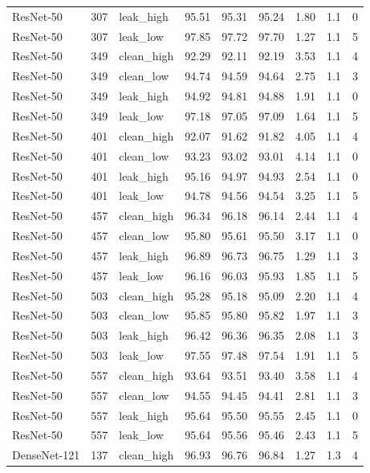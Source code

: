 {\begin{longtable}{lrlrrrrrr}
ResNet-50 & 307 & leak\_high & 95.51 & 95.31 & 95.24 & 1.80 & 1.1 & 0 \\
ResNet-50 & 307 & leak\_low & 97.85 & 97.72 & 97.70 & 1.27 & 1.1 & 5 \\
ResNet-50 & 349 & clean\_high & 92.29 & 92.11 & 92.19 & 3.53 & 1.1 & 4 \\
ResNet-50 & 349 & clean\_low & 94.74 & 94.59 & 94.64 & 2.75 & 1.1 & 3 \\
ResNet-50 & 349 & leak\_high & 94.92 & 94.81 & 94.88 & 1.91 & 1.1 & 0 \\
ResNet-50 & 349 & leak\_low & 97.18 & 97.05 & 97.09 & 1.64 & 1.1 & 5 \\
ResNet-50 & 401 & clean\_high & 92.07 & 91.62 & 91.82 & 4.05 & 1.1 & 4 \\
ResNet-50 & 401 & clean\_low & 93.23 & 93.02 & 93.01 & 4.14 & 1.1 & 0 \\
ResNet-50 & 401 & leak\_high & 95.16 & 94.97 & 94.93 & 2.54 & 1.1 & 0 \\
ResNet-50 & 401 & leak\_low & 94.78 & 94.56 & 94.54 & 3.25 & 1.1 & 5 \\
ResNet-50 & 457 & clean\_high & 96.34 & 96.18 & 96.14 & 2.44 & 1.1 & 4 \\
ResNet-50 & 457 & clean\_low & 95.80 & 95.61 & 95.50 & 3.17 & 1.1 & 0 \\
ResNet-50 & 457 & leak\_high & 96.89 & 96.73 & 96.75 & 1.29 & 1.1 & 3 \\
ResNet-50 & 457 & leak\_low & 96.16 & 96.03 & 95.93 & 1.85 & 1.1 & 5 \\
ResNet-50 & 503 & clean\_high & 95.28 & 95.18 & 95.09 & 2.20 & 1.1 & 4 \\
ResNet-50 & 503 & clean\_low & 95.85 & 95.80 & 95.82 & 1.97 & 1.1 & 3 \\
ResNet-50 & 503 & leak\_high & 96.42 & 96.36 & 96.35 & 2.08 & 1.1 & 3 \\
ResNet-50 & 503 & leak\_low & 97.55 & 97.48 & 97.54 & 1.91 & 1.1 & 5 \\
ResNet-50 & 557 & clean\_high & 93.64 & 93.51 & 93.40 & 3.58 & 1.1 & 4 \\
ResNet-50 & 557 & clean\_low & 94.55 & 94.45 & 94.41 & 2.81 & 1.1 & 3 \\
ResNet-50 & 557 & leak\_high & 95.64 & 95.50 & 95.55 & 2.45 & 1.1 & 0 \\
ResNet-50 & 557 & leak\_low & 95.64 & 95.56 & 95.46 & 2.43 & 1.1 & 5 \\
DenseNet-121 & 137 & clean\_high & 96.93 & 96.76 & 96.84 & 1.27 & 1.3 & 4 \\

\end{longtable}}
